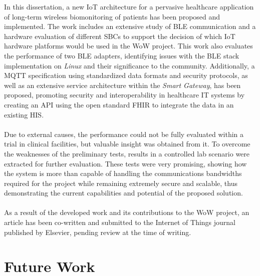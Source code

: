 



In this dissertation, a new \acs{IoT} architecture for a pervasive healthcare application of long-term wireless biomonitoring of patients has been proposed and implemented. The work includes an extensive study of \acs{BLE} communication and a hardware evaluation of different \acs{SBC}s to support the decision of which \acs{IoT} hardware platforms would be used in the \acs{WoW} project. This work also evaluates the performance of two \acs{BLE} adapters, identifying issues with the \acs{BLE} stack implementation on \textit{Linux} and their significance to the community. Additionally, a \acs{MQTT} specification using standardized data formats and security protocols, as well as an extensive service architecture within the \textit{Smart Gateway}, has been proposed, promoting security and interoperability in healthcare \acs{IT} systems by creating an \acs{API} using the open standard \acs{FHIR} to integrate the data in an existing \acs{HIS}. 

\paragraph{} Due to external causes, the performance could not be fully evaluated within a trial in clinical facilities, but valuable insight was obtained from it. To overcome the weaknesses of the preliminary tests, results in a controlled lab scenario were extracted for further evaluation. These tests were very promising, showing how the system is more than capable of handling the communications bandwidths required for the project while remaining extremely secure and scalable, thus demonstrating the current capabilities and potential of the proposed solution. 

\paragraph{} As a result of the developed work and its contributions to the \acs{WoW} project, an article \cite{Fama2021} has been co-written and submitted to the Internet of Things journal published by Elsevier, pending review at the time of writing. 

\section{Future Work}

